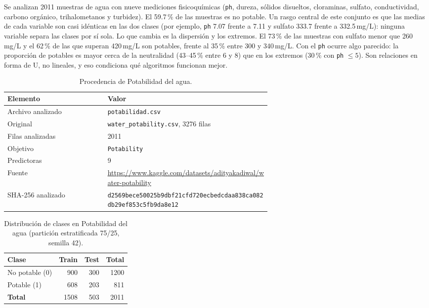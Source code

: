 \documentclass[11pt]{article}
\begin{document}
Se analizan 2011 muestras de agua con nueve mediciones fisicoquímicas (\texttt{ph},
dureza, sólidos disueltos, cloraminas, sulfato, conductividad, carbono orgánico,
trihalometanos y turbidez). El 59.7\,\% de las muestras es no potable. Un rasgo
central de este conjunto es que las medias de cada variable son casi idénticas en las
dos clases (por ejemplo, \texttt{ph} 7.07 frente a 7.11 y sulfato 333.7 frente a
332.5\,mg/L): ninguna variable separa las clases por sí sola. Lo que cambia es la
dispersión y los extremos. El 73\,\% de las muestras con sulfato menor que 260\,mg/L
y el 62\,\% de las que superan 420\,mg/L son potables, frente al 35\,\% entre 300 y
340\,mg/L. Con el \texttt{ph} ocurre algo parecido: la proporción de potables es mayor
cerca de la neutralidad (43--45\,\% entre 6 y 8) que en los extremos (30\,\% con
\texttt{ph} $\le 5$). Son relaciones en forma de U, no lineales, y eso condiciona qué
algoritmos funcionan mejor.

\begin{table}[H]\centering\small
\caption{Procedencia de Potabilidad del agua.}
\begin{tabular}{lp{0.62\linewidth}}\toprule
Elemento & Valor \\ \midrule
Archivo analizado & \texttt{potabilidad.csv} \\
Original & \texttt{water\_\allowbreak{}potability.csv}, 3276 filas \\
Filas analizadas & 2011 \\
Objetivo & \texttt{Potability} \\
Predictoras & 9 \\
Fuente & \url{https://www.kaggle.com/datasets/adityakadiwal/water-potability} \\
SHA-256 analizado & {\footnotesize\texttt{d2569bece50025b9dbf21cfd720ecbed}\newline\texttt{cdaa838ca082db29ef853c5fb9da8e12}} \\
\bottomrule\end{tabular}
\end{table}

\begin{table}[H]\centering\small
\caption{Distribución de clases en Potabilidad del agua (partición estratificada 75/25, semilla 42).}
\begin{tabular}{lrrr}\toprule
Clase & Train & Test & Total \\ \midrule
No potable (0) & 900 & 300 & 1200 \\
Potable (1) & 608 & 203 & 811 \\
\textbf{Total} & 1508 & 503 & 2011 \\
\bottomrule\end{tabular}
\end{table}
\end{document}
